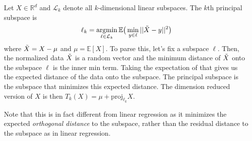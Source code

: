 \documentclass{article}
\DeclareMathOperator*{\argmin}{\arg\!\min}
\begin{document}
    \begin{definition}
      Let $X \in \mathbb{R}^d$ and $\mathcal{L}_k$ denote all $k$-dimensional linear subspaces. The $k$th principal subspace is 
      \begin{equation}
        \ell_k = \argmin_{\ell \in \mathcal{L}_k} \mathbb{E} \big( \min_{y \in \ell} ||\Tilde{X} - y||^2 \big)
      \end{equation}
      where $\Tilde{X} = X - \mu$ and $\mu = \mathbb{E}[X]$. To parse this, let's fix a subspace $\ell$. Then, the normalized data $\Tilde{X}$ is a random vector and the minimum distance of $\Tilde{X}$ onto the subspace $\ell$ is the inner min term. Taking the expectation of that gives us the expected distance of the data onto the subspace. The principal subspace is the subspace that minimizes this expected distance. The dimension reduced version of $X$ is then $T_k (X) = \mu + \mathrm{proj}_{\ell_k} X$. 
    \end{definition}

    Note that this is in fact different from linear regression as it minimizes the expected \textit{orthogonal distance} to the subspace, rather than the residual distance to the subspace as in linear regression. 
\end{document}
